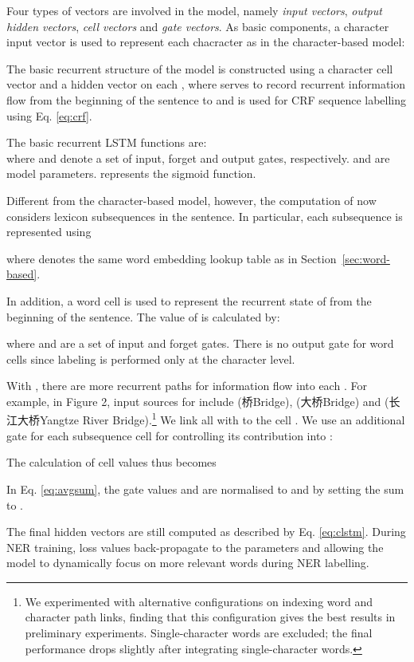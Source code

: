 \documentclass[11pt,a4paper]{article}
\begin{document}
\begin{CJK*}{UTF8}{gbsn}
Four types of vectors are involved  in the model, namely \textit{input vectors}, \textit{output hidden vectors}, \textit{cell vectors} and \textit{gate vectors}. As basic components, a character input vector is used to represent each chacracter  as in the character-based model:


The basic recurrent structure of the model is constructed using a character cell vector  and a hidden vector  on each , where  serves to record recurrent information flow from the beginning of the sentence to  and  is used for CRF sequence labelling using Eq. \ref{eq:crf}. 

The basic recurrent LSTM functions are: \\

where  and  denote a set of input, forget and output gates, respectively.  and  are model parameters.  represents the sigmoid function.

Different from the character-based model, however, the computation of  now considers lexicon subsequences  in the sentence. In particular, each subsequence  is represented using

where  denotes the same word embedding lookup table as in Section~\ref{sec:word-based}. 

In addition, a word cell  is used to represent the recurrent state of  from the beginning  of the sentence. The value of  is calculated by:


where  and  are a set of input and forget gates. There is no output gate for word cells since labeling is performed only at the character level.

With , there are more recurrent paths for information flow into each . For example, in Figure 2, input sources for  include  (桥\;Bridge),  (大桥\;Bridge) and  (长江大桥\;Yangtze River Bridge).\footnote{We experimented with alternative configurations on indexing word and character path links, finding that this configuration gives the best results in preliminary experiments. Single-character words are excluded; the final performance drops slightly after integrating single-character words.} We link all  with  to the cell .
We use an additional gate  for each subsequence cell  for controlling its contribution into :



The calculation of cell values  thus becomes


In Eq. \ref{eq:avgsum}, the gate values  and  are normalised to  and  by setting the sum to .


The final hidden vectors  are still computed as described by Eq. \ref{eq:clstm}. During NER training, loss values back-propagate to the parameters  and  allowing the model to dynamically focus on more relevant words during NER labelling. 






\end{CJK*}
\end{document}
